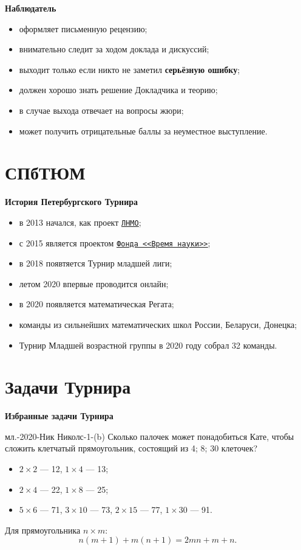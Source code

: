 \documentclass[aspectratio=1610,11pt]{beamer}
\newcommand\fram[2]{\begin{frame}{\bf #1} #2 \end{frame}}
\newcommand{\myref}[2]{\href{#1}{\texttt{\underline{#2}}}}
\def\usl#1#2{\begin{block}{#1} #2 \end{block} \medskip\pause}
\begin{document}
\fram{Наблюдатель}{
\large
\begin{itemize}
	\item оформляет письменную рецензию;\vspace{2mm}
	\item внимательно следит за ходом доклада и дискуссий;\vspace{2mm}
	\item выходит только если никто не заметил \textbf{серьёзную ошибку};\vspace{2mm}
	\item должен хорошо знать решение Докладчика  и теорию;\vspace{2mm}
	\item в случае выхода отвечает на вопросы жюри;\vspace{2mm}
	\item может получить отрицательные баллы за неуместное выступление.
\end{itemize}
}

\section{СПбТЮМ}
\fram{История Петербургского Турнира}{
\large
\begin{itemize}
	\item в 2013 начался, как проект \myref{https://lnmo.ru/}{ЛНМО};
	\item с 2015 является проектом \myref{https://timeforscience.ru/}{Фонда <<Время науки>>};
	\item в 2018 появтяется Турнир младшей лиги;
	\item летом 2020 впервые проводится онлайн;
	\item в 2020 появляется математическая Регата;
	\item команды из сильнейших математических школ России, \linebreak Беларуси, Донецка;
	\item Турнир Младшей возрастной группы в 2020 году собрал 32 команды.
\end{itemize}
}

\section{Задачи Турнира} %
\fram{Избранные задачи Турнира}{
\usl{мл.-2020-Ник Николс-1-(b)}{
Сколько палочек может понадобиться Кате, чтобы сложить клетчатый прямоугольник, состоящий из 4; 8; 30 клеточек?
}

\begin{itemize}
	\item $2 \times 2$ --- 12, $1 \times 4$ --- 13;
	\item $2 \times 4$ --- 22, $1 \times 8$ --- 25;
	\item $5 \times 6$ --- 71, $3 \times 10$ --- 73, $2 \times 15$ --- 77, $1 \times 30$ --- 91.
\end{itemize}
\pause
Для прямоугольника $n \times m$:
$$n(m+1) + m(n+1) = 2mn + m + n.$$
}
\end{document}
